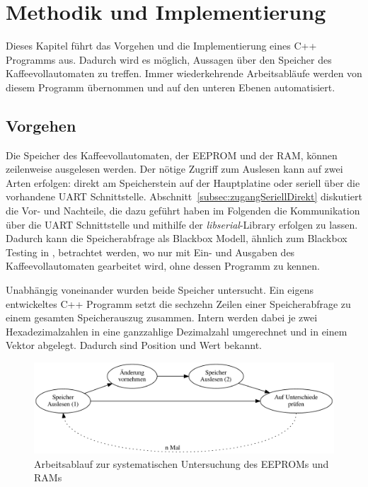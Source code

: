 \chapter{Methodik und Implementierung}\label{ch:MethodikUndImplementierung}
Dieses Kapitel führt das Vorgehen und die Implementierung eines C++ Programms aus.
Dadurch wird es möglich, Aussagen über den Speicher des Kaffeevollautomaten zu treffen.
Immer wiederkehrende Arbeitsabläufe werden von diesem Programm übernommen und auf den unteren Ebenen automatisiert.

\section{Vorgehen}\label{sec:Vorgehen}
Die Speicher des Kaffeevollautomaten, der \ac{EEPROM} und der \ac{RAM}, können zeilenweise ausgelesen werden.
Der nötige Zugriff zum Auslesen kann auf zwei Arten erfolgen: direkt am Speicherstein auf der Hauptplatine oder seriell über die vorhandene \ac{UART} Schnittstelle.
Abschnitt~\ref{subsec:zugangSeriellDirekt} diskutiert die Vor- und Nachteile, die dazu geführt haben im Folgenden die Kommunikation über die \ac{UART} Schnittstelle und mithilfe der \textit{libserial}-Library erfolgen zu lassen.
Dadurch kann die Speicherabfrage als Blackbox Modell, ähnlich zum Blackbox Testing in \cite{Solr-599853700}, betrachtet werden, wo nur mit Ein- und Ausgaben des Kaffeevollautomaten gearbeitet wird, ohne dessen Programm zu kennen.

Unabhängig voneinander wurden beide Speicher untersucht.
Ein eigens entwickeltes C++ Programm setzt die sechzehn Zeilen einer Speicherabfrage zu einem gesamten Speicherauszug zusammen.
Intern werden dabei je zwei Hexadezimalzahlen in eine ganzzahlige Dezimalzahl umgerechnet und in einem Vektor abgelegt.
Dadurch sind Position und Wert bekannt.

\begin{figure}
  \begin{center}
    \includegraphics[scale=0.6]{images/chapter_4/workflow}
    \caption{Arbeitsablauf zur systematischen Untersuchung des EEPROMs und RAMs}
    \label{fig:workflow}
  \end{center}
\end{figure}

